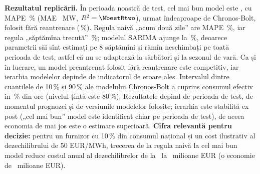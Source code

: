 %
{\textbf{Rezultatul replicării.} În perioada noastră de test, cel mai bun model este \NbestName, cu MAPE \NbestMAPE\,\% (MAE \NbestMAE\ MW, $R^2 = \NbestRtwo$), urmat îndeaproape de Chronos-Bolt, folosit fără reantrenare (\NchronosMAPE\,\%).
Regula naivă „acum două zile” are MAPE \NnaiveMAPE\,\%, iar regula „săptămîna trecută” \NweekMAPE\,\%; modelul SARIMA ajunge la \NsarimaMAPE\,\%, deoarece parametrii săi sînt estimați pe 8 săptămîni și rămîn neschimbați pe toată perioada de test, astfel că nu se adaptează la sărbători și la sezonul de vară.
Ca și în lucrare, un model preantrenat folosit fără reantrenare este competitiv, iar ierarhia modelelor depinde de indicatorul de eroare ales. Intervalul dintre cuantilele de 10\,\% și 90\,\% ale modelului Chronos-Bolt a cuprins consumul efectiv în \Ncover\,\% din ore (nivelul-țintă este 80\,\%).
Rezultatele depind de perioada de test, de momentul prognozei și de versiunile modelelor folosite; ierarhia este stabilită ex post („cel mai bun” model este identificat chiar pe perioada de test), de aceea economia de mai jos este o estimare superioară.
\textbf{Cifra relevantă pentru decizie:} pentru un furnizor cu 10\,\% din consumul național și un cost ilustrativ al dezechilibrului de 50 EUR/MWh, trecerea de la regula naivă la cel mai bun model reduce costul anual al dezechilibrelor de la \NcostNaive\ la \NcostBest\ milioane EUR (o economie de \Nsaving\ milioane EUR).}

